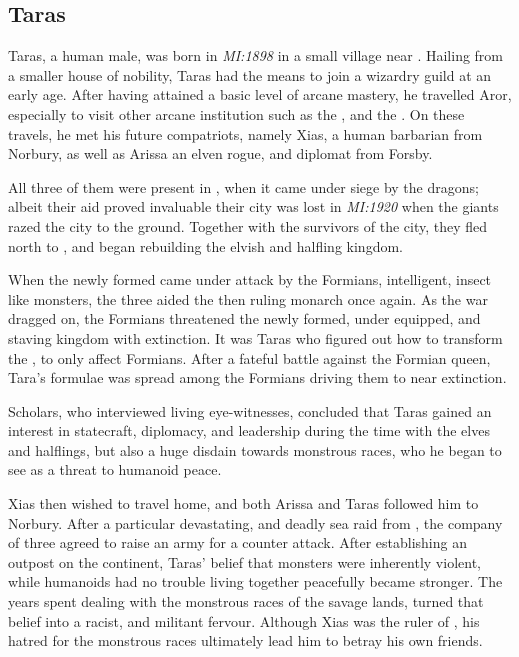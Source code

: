 \subsection{Taras}
\label{sec:Taras}

Taras, a human male, was born in \emph{MI:1898} in a small village near
. Hailing from a smaller house of nobility, Taras had
the means to join a wizardry guild at an early age. After having attained a
basic level of arcane mastery, he travelled Aror, especially to visit other
arcane institution such as the , and the
. On these travels, he met his future
compatriots, namely Xias, a human barbarian from Norbury, as well as Arissa an
elven rogue, and diplomat from Forsby.

All three of them were present in , when it came under
siege by the dragons; albeit their aid proved invaluable their city was lost in
\emph{MI:1920} when the giants razed the city to the ground. Together with the
survivors of the city, they fled north to , and began
rebuilding the elvish and halfling kingdom.

When the newly formed  came under attack by the Formians,
intelligent, insect like monsters, the three aided the then ruling monarch once
again. As the war dragged on, the Formians threatened the newly formed, under
equipped, and staving kingdom with extinction. It was Taras who figured out how
to transform the , to only affect Formians. After a
fateful battle against the Formian queen, Tara's formulae was spread among the
Formians driving them to near extinction.

Scholars, who interviewed living eye-witnesses, concluded that Taras gained an
interest in statecraft, diplomacy, and leadership during the time with the elves
and halflings, but also a huge disdain towards monstrous races, who he began to
see as a threat to humanoid peace.

Xias then wished to travel home, and both Arissa and Taras followed him to
Norbury. After a particular devastating, and deadly sea raid from
, the company of three agreed to raise an army for a
counter attack. After establishing an outpost on the continent, Taras' belief
that monsters were inherently violent, while humanoids had no trouble living
together peacefully became stronger. The years spent dealing with the
monstrous races of the savage lands, turned that belief into a racist, and
militant fervour. Although Xias was the ruler of , his
hatred for the monstrous races ultimately lead him to betray his own friends.

